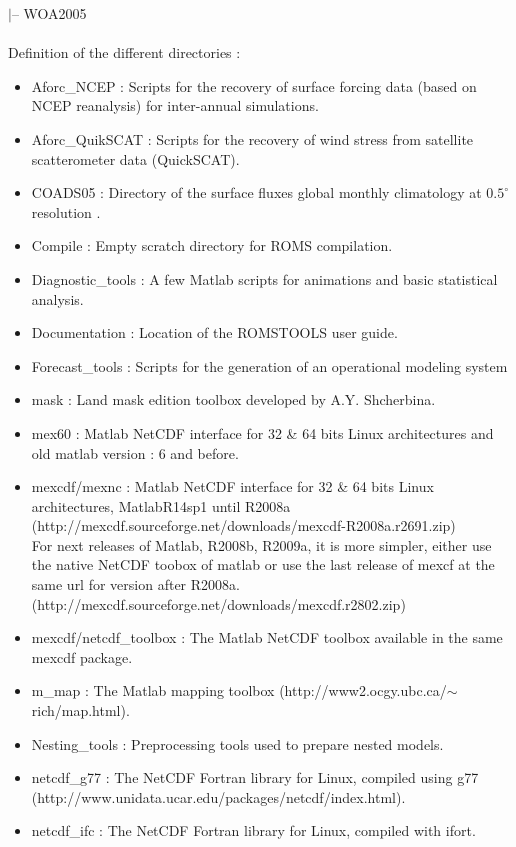 $|$-- WOA2005
\\
\\
Definition of the different directories :
\begin{itemize}
\item Aforc\_NCEP : Scripts for the recovery of surface forcing data 
      (based on NCEP reanalysis) for inter-annual simulations.
\item Aforc\_QuikSCAT : Scripts for the recovery of wind stress from 
      satellite scatterometer data (QuickSCAT).
\item COADS05 : Directory of the surface fluxes global monthly 
      climatology at $0.5^\circ$ resolution \citep{Das94}.
\item Compile : Empty scratch directory for ROMS compilation.
\item Diagnostic\_tools : A few Matlab scripts for animations and
      basic statistical analysis.
\item Documentation : Location of the ROMSTOOLS user guide.
\item Forecast\_tools : Scripts for the generation of an operational
      modeling system 
\item mask : Land mask edition toolbox developed by A.Y. Shcherbina.
\item mex60 : Matlab NetCDF interface for 32 \& 64 bits Linux architectures and old
  matlab version : 6 and before.
\item mexcdf/mexnc : Matlab NetCDF interface for 32 \& 64 bits Linux architectures,
  MatlabR14sp1 until R2008a (http://mexcdf.sourceforge.net/downloads/mexcdf-R2008a.r2691.zip) \\
  For next releases of Matlab, R2008b, R2009a, it is more simpler, either use the native NetCDF
  toobox of matlab or use the last release of mexcf at the same url for version
  after R2008a.(http://mexcdf.sourceforge.net/downloads/mexcdf.r2802.zip)
\item mexcdf/netcdf\_toolbox : The Matlab NetCDF toolbox available in the same mexcdf
  package.
\item m\_map : The Matlab mapping toolbox 
      (http://www2.ocgy.ubc.ca/$\sim$rich/map.html).
\item Nesting\_tools : Preprocessing tools used to prepare nested
      models.
\item netcdf\_g77 : The NetCDF Fortran library for Linux, compiled using g77\\
      (http://www.unidata.ucar.edu/packages/netcdf/index.html).
\item netcdf\_ifc : The NetCDF Fortran library for Linux, compiled with ifort. 

\end{itemize}
